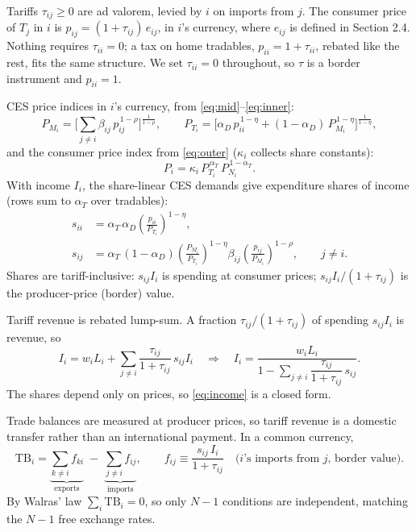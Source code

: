 \documentclass[11pt]{article}
\begin{document}
Tariffs $\tau_{ij} \geq 0$ are ad valorem, levied by $i$ on imports from $j$. The consumer price of $T_j$ in $i$ is $p_{ij} = (1+\tau_{ij})\, e_{ij}$, in $i$'s currency, where $e_{ij}$ is defined in Section 2.4. Nothing requires $\tau_{ii} = 0$; a tax on home tradables, $p_{ii} = 1+\tau_{ii}$, rebated like the rest, fits the same structure. We set $\tau_{ii} = 0$ throughout, so $\tau$ is a border instrument and $p_{ii} = 1$.

CES price indices in $i$'s currency, from \eqref{eq:mid}--\eqref{eq:inner}:
\begin{equation}
P_{M_i} = \Big[ \textstyle\sum_{j\neq i} \beta_{ij}\, p_{ij}^{\,1-\rho} \Big]^{\frac{1}{1-\rho}},
\qquad
P_{T_i} = \Big[ \alpha_D\, p_{ii}^{\,1-\eta} + (1-\alpha_D)\, P_{M_i}^{\,1-\eta} \Big]^{\frac{1}{1-\eta}},
\label{eq:indices}
\end{equation}
and the consumer price index from \eqref{eq:outer} ($\kappa_i$ collects share constants):
\begin{equation}
P_i = \kappa_i\, P_{T_i}^{\,\alpha_T}\, P_{N_i}^{\,1-\alpha_T} .
\label{eq:cpi}
\end{equation}
With income $I_i$, the share-linear CES demands give expenditure shares of income (rows sum to $\alpha_T$ over tradables):
\begin{align}
s_{ii} &= \alpha_T\, \alpha_D \left(\frac{p_{ii}}{P_{T_i}}\right)^{1-\eta},
\label{eq:shome}\\
s_{ij} &= \alpha_T\, (1-\alpha_D) \left(\frac{P_{M_i}}{P_{T_i}}\right)^{1-\eta}
\beta_{ij} \left(\frac{p_{ij}}{P_{M_i}}\right)^{1-\rho}, \qquad j \neq i .
\label{eq:sfor}
\end{align}
Shares are tariff-inclusive: $s_{ij} I_i$ is spending at consumer prices; $s_{ij} I_i / (1+\tau_{ij})$ is the producer-price (border) value.

Tariff revenue is rebated lump-sum. A fraction $\tau_{ij}/(1+\tau_{ij})$ of spending $s_{ij} I_i$ is revenue, so
\begin{equation}
I_i = w_i L_i + \sum_{j \neq i} \frac{\tau_{ij}}{1+\tau_{ij}}\, s_{ij} I_i
\quad\Longrightarrow\quad
I_i = \frac{w_i L_i}{1 - \sum_{j\neq i} \dfrac{\tau_{ij}}{1+\tau_{ij}}\, s_{ij}} .
\label{eq:income}
\end{equation}
The shares depend only on prices, so \eqref{eq:income} is a closed form.

Trade balances are measured at producer prices, so tariff revenue is a domestic transfer rather than an international payment. In a common currency,
\begin{equation}
\mathrm{TB}_i = \underbrace{\sum_{k \neq i} f_{ki}}_{\text{exports}}
\;-\; \underbrace{\sum_{j \neq i} f_{ij}}_{\text{imports}},
\qquad
f_{ij} \equiv \frac{s_{ij}\, I_i}{1+\tau_{ij}}
\quad \text{($i$'s imports from $j$, border value)} .
\label{eq:tb}
\end{equation}
By Walras' law $\sum_i \mathrm{TB}_i = 0$, so only $N-1$ conditions are independent, matching the $N-1$ free exchange rates.
\end{document}
